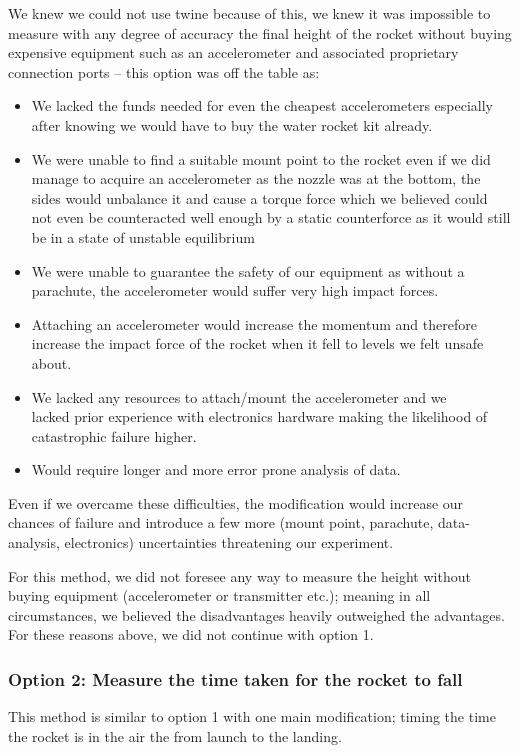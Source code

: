 \documentclass[14pt]{article}
\begin{document}
We knew we could not use twine because of this, we knew it was impossible to measure with any degree of accuracy the final height of the rocket without buying expensive equipment such as an accelerometer and associated proprietary connection ports -- this option was off the table as:
\begin{itemize}
    \item We lacked the funds needed for even the cheapest accelerometers especially after knowing we would have to buy the water rocket kit already.
    \item We were unable to find a suitable mount point to the rocket even if we did manage to acquire an accelerometer as the nozzle was at the bottom, the sides would unbalance it and cause a torque force which we believed could not even be counteracted well enough by a static counterforce as it would still be in a state of unstable equilibrium
    \item We were unable to guarantee the safety of our equipment as without a parachute, the accelerometer would suffer very high impact forces. 
    \item Attaching an accelerometer would increase the momentum and therefore increase the impact force of the rocket when it fell to levels we felt unsafe about.
    \item We lacked any resources to attach/mount the accelerometer and we \\lacked prior experience with electronics hardware making the likelihood of catastrophic failure higher.
    \item Would require longer and more error prone analysis of data.

\end{itemize}
Even if we overcame these difficulties, the modification would increase our chances of failure and introduce a few more (mount point, parachute, data-analysis, electronics) uncertainties threatening our experiment. 

For this method, we did not foresee any way to measure the height without buying equipment (accelerometer or transmitter etc.); meaning in all circumstances, we believed the disadvantages heavily outweighed the advantages. 
\\
For these reasons above, we did not continue with option 1.
\subsubsection{Option 2: Measure the time taken for the rocket to fall}
This method is similar to option 1 with one main modification; timing the time the rocket is in the air the from launch to the landing.
\end{document}
